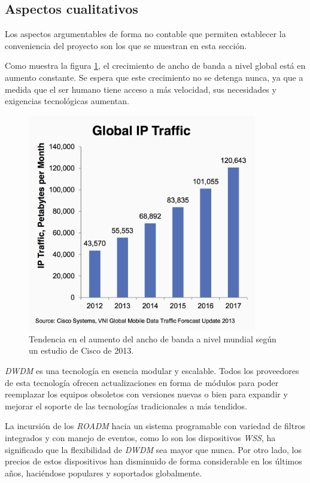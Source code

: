 \subsection{Aspectos cualitativos}
\label{sec:cualitativos}

Los aspectos argumentables de forma no contable que permiten
establecer la conveniencia del proyecto son los que se muestran en
esta sección.

Como muestra la figura \ref{fig:aumento_bw}, el crecimiento de ancho
de banda a nivel global está en aumento constante. Se espera que este
crecimiento no se detenga nunca, ya que a medida que el ser humano
tiene acceso a más velocidad, sus necesidades y exigencias tecnológicas
aumentan.

\begin{figure}[H]
  \centering
  \includegraphics[width=10cm]{Imagenes/aumento_bw.png}
  \caption{Tendencia en el aumento del ancho de banda a nivel mundial
    según un estudio de Cisco de 2013.}
  \label{fig:aumento_bw}
\end{figure}

\emph{DWDM} es una tecnología en esencia modular y escalable. Todos
los proveedores de esta tecnología ofrecen actualizaciones en forma de
módulos para poder reemplazar los equipos obsoletos con versiones
nuevas o bien para expandir y mejorar el soporte de las tecnologías
tradicionales a más tendidos.

La incursión de los \emph{ROADM} hacia un sistema programable con
variedad de filtros integrados y con manejo de eventos, como lo son
los dispositivos \emph{WSS}, ha significado que la flexibilidad de
\emph{DWDM} sea mayor que nunca. Por otro lado, los precios de estos
dispositivos han disminuido de forma considerable en los últimos años,
haciéndose populares y soportados globalmente.

